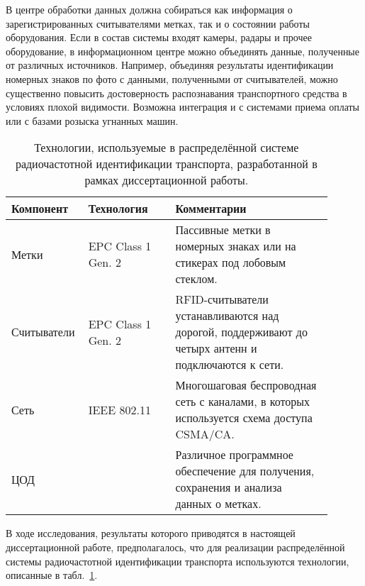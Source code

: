 В центре обработки данных должна собираться как информация о зарегистрированных считывателями метках, так и о состоянии работы оборудования. Если в состав системы входят камеры, радары и прочее оборудование, в информационном центре можно объединять данные, полученные от различных источников. Например, объединяя результаты идентификации номерных знаков по фото с данными, полученными от считывателей, можно существенно повысить достоверность распознавания транспортного средства в условиях плохой видимости. Возможна интеграция и с системами приема оплаты или с базами розыска угнанных машин.

\begin{table}[ht!]
    \renewcommand{\arraystretch}{1.3}
    \caption{Технологии, используемые в распределённой системе радиочастотной идентификации транспорта, разработанной в рамках диссертационной работы.}
    \label{table:ch1_technologies}
	\begin{tabular}{ |p{0.17\linewidth}|p{0.26\linewidth}|p{0.47\linewidth}| }\hline
		Компонент & Технология & Комментарии\\\hline\hline
		Метки & EPC Class 1 Gen. 2 & Пассивные метки в номерных знаках или на стикерах под лобовым стеклом.\\\hline
		Считыватели & EPC Class 1 Gen. 2 & RFID-считыватели устанавливаются над дорогой, поддерживают до четырх антенн и подключаются к сети.\\\hline
		Сеть & IEEE 802.11 & Многошаговая беспроводная сеть с каналами, в которых используется схема доступа CSMA/CA.\\\hline
		ЦОД &  & Различное программное обеспечение для получения, сохранения и анализа данных о метках.\\\hline
	\end{tabular}
\end{table}

В ходе исследования, результаты которого приводятся в настоящей диссертационной работе, предполагалось, что для реализации распределённой системы радиочастотной идентификации транспорта используются технологии, описанные в табл.~\ref{table:ch1_technologies}.



